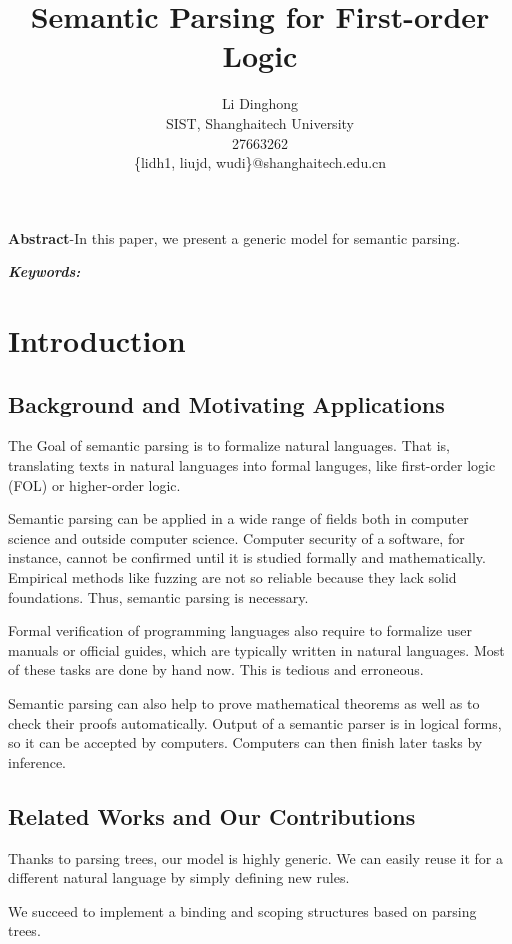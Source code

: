 \documentclass{article}
\title{Semantic Parsing for First-order Logic}
\author{
	Li Dinghong\\
	SIST, Shanghaitech University\\
	27663262\\
	\{lidh1, liujd, wudi\}@shanghaitech.edu.cn
}
\begin{document}
{
	\newpage
	\maketitle

	\textbf{Abstract}-{In this paper, we present a generic model for semantic parsing. }

	\vspace{5pt}
	\textbf{\emph{Keywords:}} {}

	\tableofcontents
}

\section{Introduction}{
	\subsection{Background and Motivating Applications}{
		The Goal of semantic parsing is to formalize natural languages. That is, translating texts in natural languages into formal languges, like first-order logic (FOL) or higher-order logic. 

		Semantic parsing can be applied in a wide range of fields both in computer science and outside computer science. Computer security of a software, for instance, cannot be confirmed until it is studied formally and mathematically. Empirical methods like fuzzing are not so reliable because they lack solid foundations. Thus, semantic parsing is necessary. 

		Formal verification of programming languages also require to formalize user manuals or official guides, which are typically written in natural languages. Most of these tasks are done by hand now. This is tedious and erroneous. 

		Semantic parsing can also help to prove mathematical theorems as well as to check their proofs automatically. Output of a semantic parser is in logical forms, so it can be accepted by computers. Computers can then finish later tasks by inference. 
	}

	\subsection{}{}

	\subsection{Related Works and Our Contributions}{
		Thanks to parsing trees, our model is highly generic. We can easily reuse it for a different natural language by simply defining new rules. 

		We succeed to implement a binding and scoping structures based on parsing trees. 
	}
}
\end{document}
